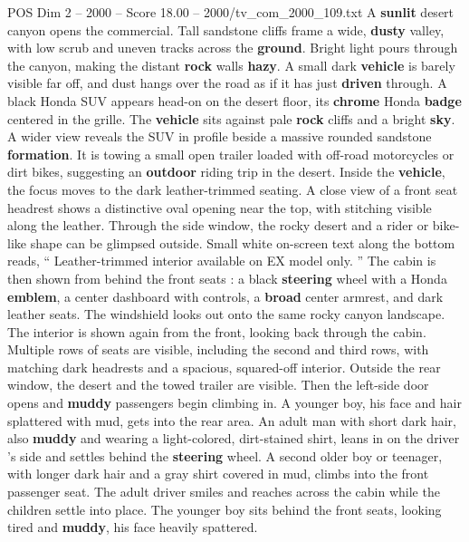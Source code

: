 \begin{textsample}{POS Dim 2 – 2000 – Score 18.00 – 2000/tv\_com\_2000\_109.txt}  \label{ex:f2_pos_029}
A \textbf{sunlit} desert canyon opens the commercial.
Tall sandstone cliffs frame a wide, \textbf{dusty} valley, with low scrub and uneven tracks across the \textbf{ground}.
Bright light pours through the canyon, making the distant \textbf{rock} walls \textbf{hazy}.
A small dark \textbf{vehicle} is barely visible far off, and dust hangs over the road as if it has just \textbf{driven} through.
A black Honda SUV appears head-on on the desert floor, its \textbf{chrome} Honda \textbf{badge} centered in the grille.
The \textbf{vehicle} sits against pale \textbf{rock} cliffs and a bright \textbf{sky}.
A wider view reveals the SUV in profile beside a massive rounded sandstone \textbf{formation}.
It is towing a small open trailer loaded with off-road motorcycles or dirt bikes, suggesting an \textbf{outdoor} riding trip in the desert.
Inside the \textbf{vehicle}, the focus moves to the dark leather-trimmed seating.
A close view of a front seat headrest shows a distinctive oval opening near the top, with stitching visible along the leather.
Through the side window, the rocky desert and a rider or bike-like shape can be glimpsed outside.
Small white on-screen text along the bottom reads, “ Leather-trimmed interior available on EX model only. ” The cabin is then shown from behind the front seats : a black \textbf{steering} wheel with a Honda \textbf{emblem}, a center dashboard with controls, a \textbf{broad} center armrest, and dark leather seats.
The windshield looks out onto the same rocky canyon landscape.
The interior is shown again from the front, looking back through the cabin.
Multiple rows of seats are visible, including the second and third rows, with matching dark headrests and a spacious, squared-off interior.
Outside the rear window, the desert and the towed trailer are visible.
Then the left-side door opens and \textbf{muddy} passengers begin climbing in.
A younger boy, his face and hair splattered with mud, gets into the rear area.
An adult man with short dark hair, also \textbf{muddy} and wearing a light-colored, dirt-stained shirt, leans in on the driver ’s side and settles behind the \textbf{steering} wheel.
A second older boy or teenager, with longer dark hair and a gray shirt covered in mud, climbs into the front passenger seat.
The adult driver smiles and reaches across the cabin while the children settle into place.
The younger boy sits behind the front seats, looking tired and \textbf{muddy}, his face heavily spattered.

\end{textsample}
